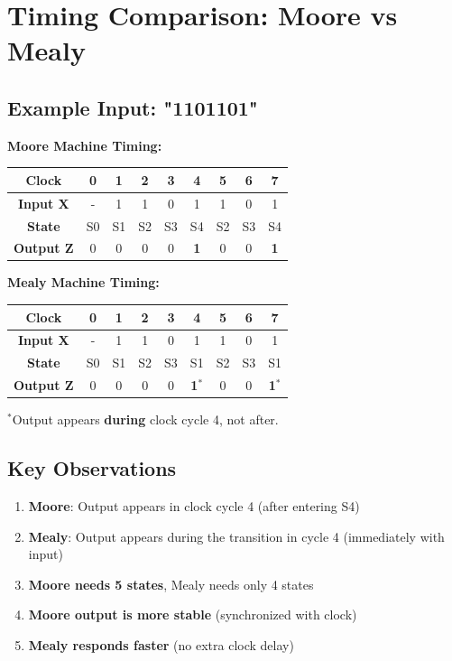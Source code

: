 \documentclass[12pt,a4paper]{article}
\begin{document}
\newpage
\section{Timing Comparison: Moore vs Mealy}

\subsection{Example Input: "1101101"}

\textbf{Moore Machine Timing:}
\begin{center}
\begin{tabular}{|c|c|c|c|c|c|c|c|c|}
\hline
\textbf{Clock} & 0 & 1 & 2 & 3 & 4 & 5 & 6 & 7 \\
\hline
\textbf{Input X} & - & 1 & 1 & 0 & 1 & 1 & 0 & 1 \\
\hline
\textbf{State} & S0 & S1 & S2 & S3 & \cellcolor{solarizedGreen!30}S4 & S2 & S3 & \cellcolor{solarizedGreen!30}S4 \\
\hline
\textbf{Output Z} & 0 & 0 & 0 & 0 & \textbf{1} & 0 & 0 & \textbf{1} \\
\hline
\end{tabular}
\end{center}

\textbf{Mealy Machine Timing:}
\begin{center}
\begin{tabular}{|c|c|c|c|c|c|c|c|c|}
\hline
\textbf{Clock} & 0 & 1 & 2 & 3 & 4 & 5 & 6 & 7 \\
\hline
\textbf{Input X} & - & 1 & 1 & 0 & 1 & 1 & 0 & 1 \\
\hline
\textbf{State} & S0 & S1 & S2 & S3 & S1 & S2 & S3 & S1 \\
\hline
\textbf{Output Z} & 0 & 0 & 0 & 0 & \textbf{1}$^*$ & 0 & 0 & \textbf{1}$^*$ \\
\hline
\end{tabular}
\end{center}
$^*$Output appears \textbf{during} clock cycle 4, not after.

\subsection{Key Observations}
\begin{enumerate}
    \item \textbf{Moore}: Output appears in clock cycle 4 (after entering S4)
    \item \textbf{Mealy}: Output appears during the transition in cycle 4 (immediately with input)
    \item \textbf{Moore needs 5 states}, Mealy needs only 4 states
    \item \textbf{Moore output is more stable} (synchronized with clock)
    \item \textbf{Mealy responds faster} (no extra clock delay)
\end{enumerate}
\end{document}
